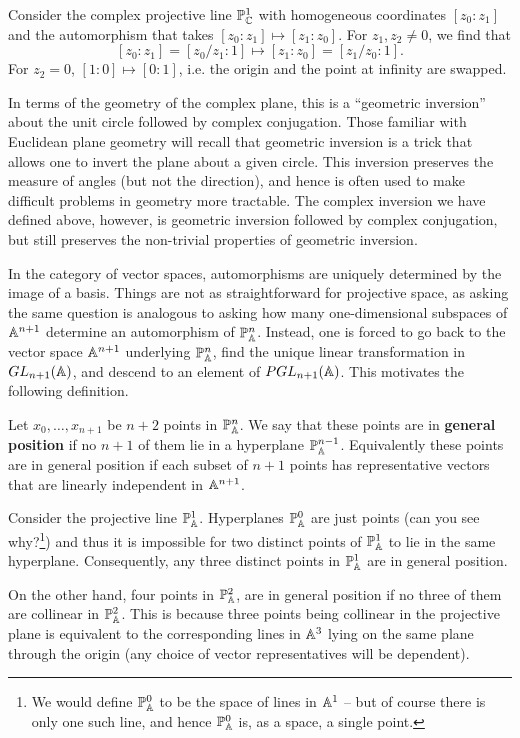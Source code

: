 \documentclass{../../mathnotes}
\begin{document}
\begin{exmp}
    Consider the complex projective line $\mathbb{P}^1_{\mathbb{C}}$ with homogeneous coordinates $[z_0:z_1]$ and the automorphism
    that takes $[z_0:z_1]\mapsto[z_1:z_0]$. For $z_1,z_2\neq0$, we find that
    \[ [z_0:z_1]=[z_0/z_1:1]\mapsto [z_1:z_0]=[z_1/z_0:1]. \]
    For $z_2=0$, $[1:0]\mapsto[0:1]$, i.e. the origin and the point at infinity are swapped.

    In terms of the geometry of the complex plane, this is a ``geometric inversion'' about the unit circle followed by complex conjugation.
    Those familiar with Euclidean plane geometry will recall that geometric inversion is a trick that allows one to
    invert the plane about a given circle. This inversion preserves the measure of angles (but not the direction), and hence
    is often used to make difficult problems in geometry more tractable. The complex inversion we have defined above,
    however, is geometric inversion followed by complex conjugation, but still preserves the non-trivial properties of
    geometric inversion.
\end{exmp}

In the category of vector spaces, automorphisms are uniquely determined by the image of a basis. Things are not as straightforward
for projective space, as asking the same question is analogous to asking how many one-dimensional subspaces of $\mathbb{A}^{n+1}$ determine
an automorphism of $\mathbb{P}^n_{\mathbb{A}}$. Instead, one is forced to go back to the vector space $\mathbb{A}^{n+1}$ underlying $\mathbb{P}^n_{\mathbb{A}}$, find
the unique linear transformation in $GL_{n+1}(\mathbb{A})$, and descend to an element of $PGL_{n+1}(\mathbb{A})$.
This motivates the following definition.

\begin{defn}
    Let $x_0,\ldots, x_{n+1}$ be $n+2$ points in $\mathbb{P}^n_{\mathbb{A}}$. We say that these points are in \textbf{general position}
    if no $n+1$ of them lie in a hyperplane $\mathbb{P}_{\mathbb{A}}^{n-1}$.
    Equivalently these points are in general position if each subset of $n+1$ points has representative vectors that are
    linearly independent in $\mathbb{A}^{n+1}$.
\end{defn}

\begin{exmp}
    Consider the projective line $\mathbb{P}^1_{\mathbb{A}}$. Hyperplanes $\mathbb{P}_{\mathbb{A}}^0$ are just points (can you see why?\footnote{We would define $\mathbb{P}_{\mathbb{A}}^0$
    to be the space of lines in $\mathbb{A}^1$ -- but of course there is only one such line, and hence $\mathbb{P}_{\mathbb{A}}^0$ is, as a space, a single point.})
    and thus it is impossible for two distinct points of $\mathbb{P}^1_{\mathbb{A}}$ to lie in the same hyperplane. Consequently, any three distinct points
    in $\mathbb{P}^1_{\mathbb{A}}$ are in general position.

    On the other hand, four points in $\mathbb{P}^2_{\mathbb{A}}$, are in general position if no three of them are collinear in $\mathbb{P}^2_{\mathbb{A}}$.
    This is because three points being collinear in the projective plane is equivalent to the corresponding lines in $\mathbb{A}^3$
    lying on the same plane through the origin (any choice of vector representatives will be dependent).
\end{exmp}
\end{document}
